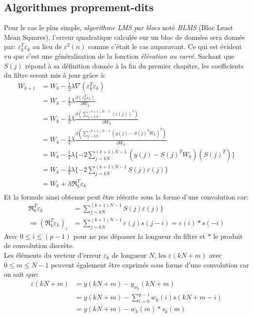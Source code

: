 \subsection{Algorithmes proprement-dits \cite{ThAlaedine}}
Pour le cas le plus simple, \emph{algorithme LMS par blocs} noté \emph{BLMS} (Bloc Least Mean Squares), l'erreur quadratique calculée sur un bloc de données sera donnée par: $ \varepsilon_{k}^{T}\varepsilon_{k} $     au lieu de     $ \varepsilon^{2}(n) $ comme c'était le cas auparavant. Ce qui est évident vu que c'est une généralisation de la fonction \emph{élévation au carré}.
Sachant que $ S(j) $ répond à sa définition donnée à la fin du premier chapitre, les coefficients du filtre seront mis à jour grâce à:
\begin{align*}
W_{k+1} &=W_{k}-\frac{1}{2}\lambda\nabla(\varepsilon_{k}^{T}\varepsilon_{k})\\
&=W_{k}-\frac{1}{2}\lambda\frac{\partial(\varepsilon_{k}^{T}\varepsilon_{k})}{\partial W_{k}}\\
&=W_{k}-\frac{1}{2}\lambda\frac{\partial(\sum_{j=kN}^{(k+1)N-1}(\varepsilon(j))^{2})}{\partial W_{k}}\\
&=W_{k}-\frac{1}{2}\lambda\frac{\partial(\sum_{j=kN}^{(k+1)N-1}(y(j)-S(j)^{T}W_{k})^{2})}{\partial W_{k}}\\
&=W_{k}-\frac{1}{2}\lambda\{-2\sum_{j=kN}^{(k+1)N-1}(y(j)-S(j)^{T}W_{k})(S(j)^{T})\}\\
&=W_{k}-\frac{1}{2}\lambda\{-2\sum_{j=kN}^{(k+1)N-1}S(j)\varepsilon(j)\}\\
&=W_{k}+\lambda\mathfrak{R}_{k}^{T}\varepsilon_{k}\\
\end{align*}
Et la formule ainsi obtenue peut être réécrite sous la forme d'une convolution car:
\begin{align*}
\mathfrak{R}_{k}^{T}\varepsilon_{k}&=\sum_{j=kN}^{(k+1)N-1}S(j)\varepsilon(j)\}\\
\Rightarrow (\mathfrak{R}_{k}^{T}\varepsilon_{k})_{i} &=\sum_{j=kN}^{(k+1)N-1}\varepsilon(j)s(j-i)=\varepsilon(i)\ast s(-i)
\end{align*}
Avec  $ 0\leq i\leq (p-1) $ pour ne pas dépasser la longueur du filtre et $ \ast $ le produit de convolution discrète.\\
Les éléments du vecteur d'erreur $ \varepsilon_{k} $ de longueur $ N $, les $ \varepsilon(kN+m) $ avec $ 0\leq m\leq N-1 $ peuvent également être exprimés sous forme d'une convolution car on sait que:
\begin{align*}
\varepsilon(kN+m) &= y(kN+m)-y_{w_{k}}(kN+m)\\
&=y(kN+m)-\sum_{i=0}^{p-1}w_{k}(i)s(kN+m-i)\\
&=y(kN+m)-w_{k}(m)\ast s_{k}(m)
\end{align*}
